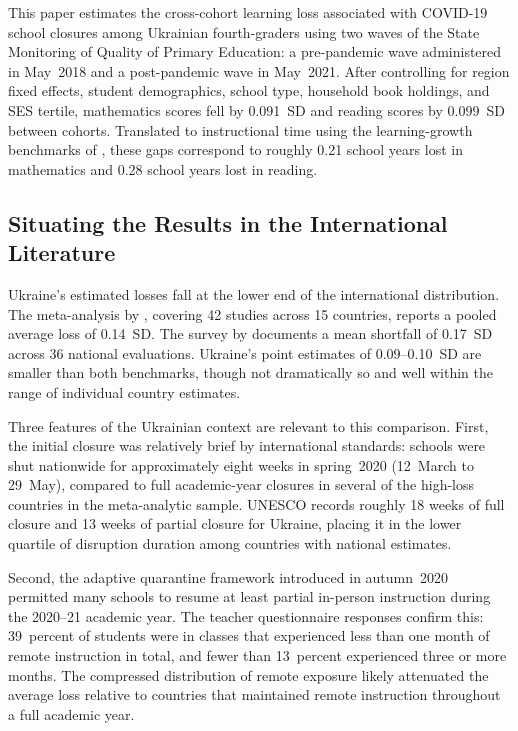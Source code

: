 
This paper estimates the cross-cohort learning loss associated with
COVID-19 school closures among Ukrainian fourth-graders using two waves
of the State Monitoring of Quality of Primary Education: a pre-pandemic
wave administered in May~2018 and a post-pandemic wave in May~2021.
After controlling for region fixed effects, student demographics, school
type, household book holdings, and SES tertile, mathematics scores fell
by 0.091~SD and reading scores by 0.099~SD between cohorts. Translated
to instructional time using the learning-growth benchmarks of
\citet{hill2008empirical}, these gaps correspond to roughly 0.21 school
years lost in mathematics and 0.28 school years lost in reading.

\subsection*{Situating the Results in the International Literature}

Ukraine's estimated losses fall at the lower end of the international
distribution. The meta-analysis by \citet{betthaeuser2023systematic},
covering 42 studies across 15 countries, reports a pooled average loss
of 0.14~SD. The survey by \citet{patrinos2022learning} documents a mean
shortfall of 0.17~SD across 36 national evaluations. Ukraine's point
estimates of 0.09--0.10~SD are smaller than both benchmarks, though
not dramatically so and well within the range of individual country
estimates.

Three features of the Ukrainian context are relevant to this comparison.
First, the initial closure was relatively brief by international standards:
schools were shut nationwide for approximately eight weeks in spring~2020
(12~March to 29~May), compared to full academic-year closures in
several of the high-loss countries in the meta-analytic sample.
UNESCO records roughly 18 weeks of full closure and 13 weeks of partial
closure for Ukraine, placing it in the lower quartile of disruption
duration among countries with national estimates.

Second, the adaptive quarantine framework introduced in autumn~2020
permitted many schools to resume at least partial in-person instruction
during the 2020--21 academic year. The teacher questionnaire responses
confirm this: 39~percent of students were in classes that experienced
less than one month of remote instruction in total, and fewer than
13~percent experienced three or more months. The compressed distribution
of remote exposure likely attenuated the average loss relative to
countries that maintained remote instruction throughout a full academic
year.


